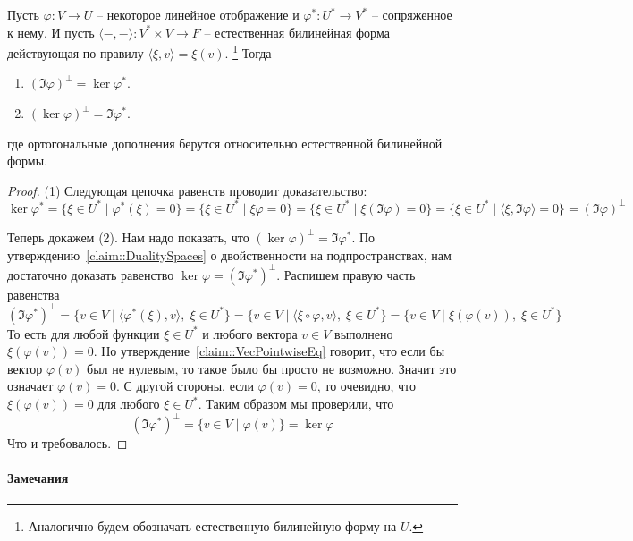 \begin{claim}
\label{claim::Fredholm}
Пусть $\varphi\colon V\to U$ -- некоторое линейное отображение и $\varphi^*\colon U^*\to V^*$ -- сопряженное к нему.
И пусть $\langle{-},{-}\rangle \colon V^* \times V\to F$ -- естественная билинейная форма действующая по правилу $\langle \xi, v\rangle = \xi(v)$.%
\footnote{Аналогично будем обозначать естественную билинейную форму на $U$.}
Тогда
\begin{enumerate}
\item $(\Im \varphi)^\bot = \ker \varphi^*$.

\item $(\ker \varphi)^\bot = \Im \varphi^*$.
\end{enumerate}
где ортогональные дополнения берутся относительно естественной билинейной формы.
\end{claim}
\begin{proof}
(1) Следующая цепочка равенств проводит доказательство:
\[
\ker\varphi^* =\{\xi \in U^*\mid \varphi^*(\xi) = 0\} = \{\xi \in U^*\mid \xi \varphi = 0\} = \{\xi\in U^*\mid \xi(\Im \varphi) = 0\} = \{\xi\in U^*\mid \langle \xi, \Im\varphi\rangle = 0\} = (\Im \varphi)^\bot
\]

Теперь докажем (2).
Нам надо показать, что $(\ker \varphi)^\bot = \Im \varphi^*$.
По утверждению~\ref{claim::DualitySpaces} о двойственности на подпространствах, нам достаточно доказать равенство $\ker \varphi = (\Im \varphi^*)^\bot$.
Распишем правую часть равенства
\[
(\Im \varphi^*)^\bot = \{v\in V \mid \langle \varphi^*(\xi), v\rangle,\;\xi\in U^*\} = \{v\in V \mid \langle \xi\circ \varphi , v\rangle,\;\xi\in U^*\} = \{v\in V \mid \xi (\varphi (v)),\;\xi\in U^*\}
\]
То есть для любой функции $\xi\in U^*$ и любого вектора $v\in V$ выполнено $\xi(\varphi(v)) = 0$.
Но утверждение~\ref{claim::VecPointwiseEq} говорит, что если бы вектор $\varphi(v)$ был не нулевым, то такое было бы просто не возможно.
Значит это означает $\varphi(v) = 0$.
С другой стороны, если $\varphi(v) = 0$, то очевидно, что $\xi(\varphi(v)) = 0$ для любого $\xi\in U^*$.
Таким образом мы проверили, что
\[
(\Im \varphi^*)^\bot =  \{v\in V \mid \varphi (v)\} = \ker\varphi
\]
Что и требовалось.
\end{proof}

\paragraph{Замечания}

